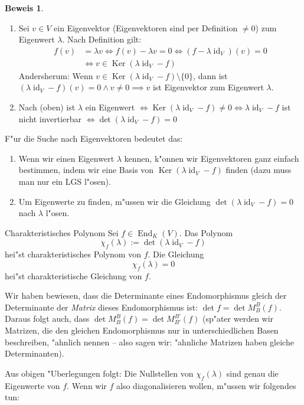 \documentclass[oneside,fontsize=11pt,paper=a4,BCOR=0mm,DIV=12,automark,headsepline]{scrbook}
\newcommand{\gq}[1]{\glqq{}#1\grqq{}} %
\DeclareMathOperator{\mKer}{Ker}
\DeclareMathOperator{\mId}{id}
\DeclareMathOperator{\mEnd}{End}
\theoremstyle{remark}
\theoremstyle{definition}
\theoremstyle{definition}
\newtheorem*{prof}{Beweis}
\theoremstyle{remark}
\begin{document}
\begin{prof}
  \begin{enumerate}
  \item Sei \(v\in V\) ein Eigenvektor (Eigenvektoren sind per Definition \(\neq 0\)) zum Eigenwert \(\lambda\). Nach Definition gilt:
    \begin{align*}
      f(v) &= \lambda v \iff f(v) - \lambda v = 0 \iff (f - \lambda\mId_V)(v) = 0 \\
      &\iff v\in \mKer(\lambda\mId_V - f)
    \end{align*}
    Andersherum: Wenn \(v \in \mKer(\lambda\mId_V -f)\setminus\{0\}\), dann ist \((\lambda\mId_V -f)(v)=0\land v\neq 0 \implies v\) ist Eigenvektor zum Eigenwert \(\lambda\).
  \item Nach (oben) ist \(\lambda\) ein Eigenwert \(\iff\mKer(\lambda\mId_V -f)\neq 0\)\(\iff \lambda\mId_V -f\) ist nicht invertierbar \(\iff\det(\lambda\mId_V - f) = 0\)
  \end{enumerate}
\end{prof}
F"ur die Suche nach Eigenvektoren bedeutet das:
\begin{enumerate}
\item Wenn wir einen Eigenwert \(\lambda\) kennen, k"onnen wir Eigenvektoren ganz einfach bestimmen, indem wir eine Basis von \(\mKer(\lambda\mId_V -f)\) finden (dazu muss man nur ein LGS l"osen).
  \item Um Eigenwerte zu finden, m"ussen wir die Gleichung \(\det(\lambda\mId_V - f) = 0\) nach \(\lambda\) l"osen.
  \end{enumerate}
\begin{definition}{Charakteristisches Polynom}{}
  Sei \(f\in\mEnd_K(V)\). Das Polynom \[\chi_f(\lambda) := \det(\lambda\mId_V-f)\] hei"st charakteristisches Polynom von \(f\). Die Gleichung \[\chi_f(\lambda) = 0\] hei"st charakteristische Gleichung von \(f\).
\end{definition}
\begin{comm}
  Wir haben bewiesen, dass die Determinante eines Endomorphismus gleich der Determinante der \emph{Matrix} dieses Endomorphismus ist: \(\det f = \det M_B^B(f)\). Daraus folgt auch, dass \(\det M_B^B(f) = \det M_{B'}^{B'}(f)\) (sp"ater werden wir Matrizen, die den gleichen Endomorphismus nur in unterschiedlichen Basen beschreiben, \gq{"ahnlich} nennen -- also sagen wir: "ahnliche Matrizen haben gleiche Determinanten).
\end{comm}
Aus obigen "Uberlegungen folgt: Die Nullstellen von \(\chi_f(\lambda)\) sind genau die Eigenwerte von \(f\). Wenn wir \(f\) also diagonalisieren wollen, m"ussen wir folgendes tun:
\end{document}

